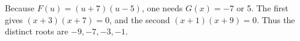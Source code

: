 Because $F(u)=(u+7)(u-5)$, one needs $G(x)=-7$ or 5. The first gives $(x+3)(x+7)=0$, and the second $(x+1)(x+9)=0$. Thus the distinct roots are $\boxed{-9,-7,-3,-1}$.

